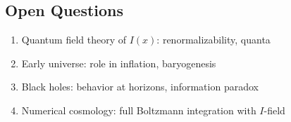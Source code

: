 \documentclass[12pt, a4paper]{article}
\begin{document}
\subsection{Open Questions}

\begin{enumerate}
    \item Quantum field theory of $I(x)$: renormalizability, quanta
    \item Early universe: role in inflation, baryogenesis
    \item Black holes: behavior at horizons, information paradox
    \item Numerical cosmology: full Boltzmann integration with $I$-field
\end{enumerate}

\end{document}
